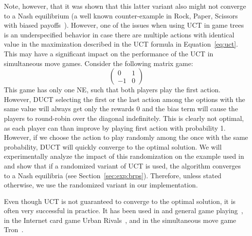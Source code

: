 Note, however, that it was shown that this latter variant also might not converge to a Nash equilibrium (a well known counter-example in Rock, Paper, Scissors with biased payoffs~\cite{Shafiei09}). 
However, one of the issues when using UCT in game trees is an underspecified behavior in case there are multiple actions with identical value in the maximization described in the UCT formula in Equation~\ref{eq:uct}.
This may have a significant impact on the performance of the UCT in simultaneous move games. 
Consider the following matrix game:
$$\left(\begin{array}{cc}
0 & 1\\
-1 & 0
\end{array}\right)$$
This game has only one NE, such that both players play the first action. However, DUCT selecting the first or the last action among the options with the same value will always get only the rewards 0 and the bias term will cause the players to round-robin over the diagonal indefinitely. This is clearly not optimal, as each player can than improve by playing first action with probability 1. However, if we choose the action to play randomly among the once with the same probability, DUCT will quickly converge to the optimal solution. 
We will experimentally analyze the impact of this randomization on the example used in~\cite{Shafiei09} and show that if a randomized variant of UCT is used, the algorithm converges to a Nash equilibria (see Section~\ref{sec:exp:brps}).
Therefore, unless stated otherwise, we use the randomized variant in our implementation.


Even though UCT is not guaranteed to converge to the optimal solution, it is often very successful in practice.
It has been used in and general game playing~\cite{Finnsson12}, in the Internet card game Urban Rivals~\cite{Teytaud11Upper},
and in the simultaneous move game Tron~\cite{Perick12Comparison}.


